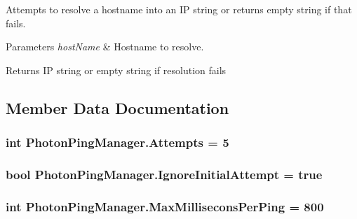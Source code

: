 Attempts to resolve a hostname into an IP string or returns empty string if that fails. 


\begin{DoxyParams}{Parameters}
{\em host\+Name} & Hostname to resolve.\\
\hline
\end{DoxyParams}
\begin{DoxyReturn}{Returns}
IP string or empty string if resolution fails
\end{DoxyReturn}


\subsection{Member Data Documentation}
\subsubsection[{\texorpdfstring{Attempts}{Attempts}}]{\setlength{\rightskip}{0pt plus 5cm}int Photon\+Ping\+Manager.\+Attempts = 5\hspace{0.3cm}{\ttfamily [static]}}\hypertarget{class_photon_ping_manager_aa37a48018a49beafdb317dbdfbff6d54}{}\label{class_photon_ping_manager_aa37a48018a49beafdb317dbdfbff6d54}
\subsubsection[{\texorpdfstring{Ignore\+Initial\+Attempt}{IgnoreInitialAttempt}}]{\setlength{\rightskip}{0pt plus 5cm}bool Photon\+Ping\+Manager.\+Ignore\+Initial\+Attempt = true\hspace{0.3cm}{\ttfamily [static]}}\hypertarget{class_photon_ping_manager_a0e897316745a60839e2ed3e80cefd2f2}{}\label{class_photon_ping_manager_a0e897316745a60839e2ed3e80cefd2f2}
\subsubsection[{\texorpdfstring{Max\+Millisecons\+Per\+Ping}{MaxMilliseconsPerPing}}]{\setlength{\rightskip}{0pt plus 5cm}int Photon\+Ping\+Manager.\+Max\+Millisecons\+Per\+Ping = 800\hspace{0.3cm}{\ttfamily [static]}}\hypertarget{class_photon_ping_manager_ac0c24ceeeff3345bcf1d98bbe37b4014}{}\label{class_photon_ping_manager_ac0c24ceeeff3345bcf1d98bbe37b4014}
